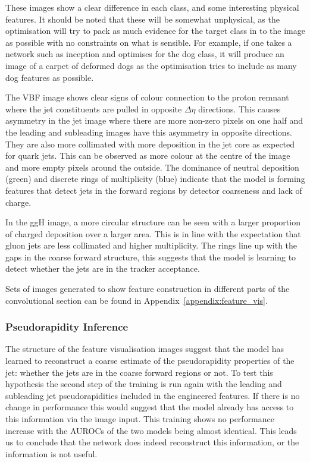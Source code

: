 These images show a clear difference in each class, and some interesting physical features. It should be noted that these will be somewhat unphysical, as the optimisation will try to pack as much evidence for the target class in to the image as possible with no constraints on what is sensible. For example, if one takes a network such as inception and optimises for the dog class, it will produce an image of a carpet of deformed dogs as the optimisation tries to include as many dog features as possible. 


The VBF image shows clear signs of colour connection to the proton remnant where the jet constituents are pulled in opposite $\Delta\eta$ directions. This causes asymmetry in the jet image where there are more non-zero pixels on one half and the leading and subleading images have this asymmetry in opposite directions.
They are also more collimated with more \pt  deposition in the jet core as expected for quark jets. This can be observed as more colour at the centre of the image and more empty pixels around the outside. The dominance of neutral \pt deposition (green) and discrete rings of multiplicity (blue) indicate that the model is forming features that detect jets in the forward regions by detector coarseness and lack of charge. 

In the ggH image, a more circular structure can be seen with a larger proportion of charged deposition over a larger area. This is in line with the expectation that gluon jets are less collimated and higher multiplicity. The rings line up with the gaps in the coarse forward structure, this suggests that the model is learning to detect whether the jets are in the tracker acceptance. 

Sets of images generated to show feature construction in different parts of the convolutional section can be found in Appendix~\ref{appendix:feature_vis}.


\subsubsection{Pseudorapidity Inference}
The structure of the feature visualisation images suggest that the model has learned to reconstruct a coarse estimate of the pseudorapidity properties of the jet: whether the jets are in the coarse forward regions or not. 
To test this hypothesis the second step of the training is run again with the leading and subleading jet pseudorapidities included in the engineered features. If there is no change in performance this would suggest that the model already has access to this information via the image input. This training shows no performance increase with the AUROCs of the two models being almost identical. This leads us to conclude that the network does indeed reconstruct this information, or the information is not useful.

